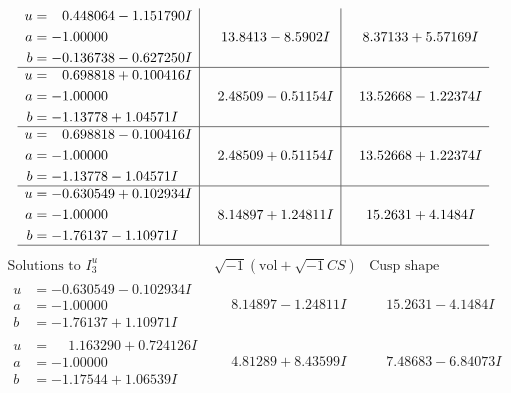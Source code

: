 \documentclass[1p]{elsarticle_modified}
\theoremstyle{definition}
\newcommand{\I}{\sqrt{-1}}
\begin{document}
$$\begin{array}{c|c|c}
\begin{aligned}
u &= \phantom{-}0.448064 - 1.151790 I \\
a &= -1.00000\phantom{ +0.000000I} \\
b &= -0.136738 - 0.627250 I\end{aligned}
 & \phantom{-}13.8413 - 8.5902 I & \phantom{-}8.37133 + 5.57169 I \\ \hline\begin{aligned}
u &= \phantom{-}0.698818 + 0.100416 I \\
a &= -1.00000\phantom{ +0.000000I} \\
b &= -1.13778 + 1.04571 I\end{aligned}
 & \phantom{-}2.48509 - 0.51154 I & \phantom{-}13.52668 - 1.22374 I \\ \hline\begin{aligned}
u &= \phantom{-}0.698818 - 0.100416 I \\
a &= -1.00000\phantom{ +0.000000I} \\
b &= -1.13778 - 1.04571 I\end{aligned}
 & \phantom{-}2.48509 + 0.51154 I & \phantom{-}13.52668 + 1.22374 I \\ \hline\begin{aligned}
u &= -0.630549 + 0.102934 I \\
a &= -1.00000\phantom{ +0.000000I} \\
b &= -1.76137 - 1.10971 I\end{aligned}
 & \phantom{-}8.14897 + 1.24811 I & \phantom{-}15.2631 + 4.1484 I\\
 \hline 
 \end{array}$$\newpage$$\begin{array}{c|c|c}  
\text{Solutions to }I^u_{3}& \I (\text{vol} + \sqrt{-1}CS) & \text{Cusp shape}\\
 \hline 
\begin{aligned}
u &= -0.630549 - 0.102934 I \\
a &= -1.00000\phantom{ +0.000000I} \\
b &= -1.76137 + 1.10971 I\end{aligned}
 & \phantom{-}8.14897 - 1.24811 I & \phantom{-}15.2631 - 4.1484 I \\ \hline\begin{aligned}
u &= \phantom{-}1.163290 + 0.724126 I \\
a &= -1.00000\phantom{ +0.000000I} \\
b &= -1.17544 + 1.06539 I\end{aligned}
 & \phantom{-}4.81289 + 8.43599 I & \phantom{-}7.48683 - 6.84073 I \\ \hline\begin{aligned}

\end{aligned}
\end{array}$$
\end{document}

